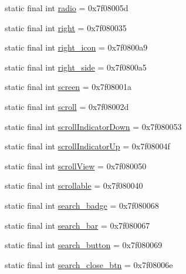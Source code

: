 \begin{CompactItemize}
\item 
static final int \hyperlink{classandroid_1_1support_1_1v7_1_1appcompat_1_1_r_1_1id_89606045473fd367db28248ace909c6f}{radio} = 0x7f08005d
\item 
static final int \hyperlink{classandroid_1_1support_1_1v7_1_1appcompat_1_1_r_1_1id_962917c5f791ff33a342365acbe1f9f0}{right} = 0x7f080035
\item 
static final int \hyperlink{classandroid_1_1support_1_1v7_1_1appcompat_1_1_r_1_1id_c4b2f4c310d9eadb3d4463b2d607e720}{right\_\-icon} = 0x7f0800a9
\item 
static final int \hyperlink{classandroid_1_1support_1_1v7_1_1appcompat_1_1_r_1_1id_aed558b6dc9fed0542465c08552c52e2}{right\_\-side} = 0x7f0800a5
\item 
static final int \hyperlink{classandroid_1_1support_1_1v7_1_1appcompat_1_1_r_1_1id_295d9d8a114c45191be984373ee8ff25}{screen} = 0x7f08001a
\item 
static final int \hyperlink{classandroid_1_1support_1_1v7_1_1appcompat_1_1_r_1_1id_e0c395762b21ee44e926575f7b79d036}{scroll} = 0x7f08002d
\item 
static final int \hyperlink{classandroid_1_1support_1_1v7_1_1appcompat_1_1_r_1_1id_8c898ecef26395ae87d51f45e345d2a4}{scrollIndicatorDown} = 0x7f080053
\item 
static final int \hyperlink{classandroid_1_1support_1_1v7_1_1appcompat_1_1_r_1_1id_fad825b3b572d052312cf45b17f80b56}{scrollIndicatorUp} = 0x7f08004f
\item 
static final int \hyperlink{classandroid_1_1support_1_1v7_1_1appcompat_1_1_r_1_1id_5381944d6f7d389cc7821c5cd06ce43b}{scrollView} = 0x7f080050
\item 
static final int \hyperlink{classandroid_1_1support_1_1v7_1_1appcompat_1_1_r_1_1id_f0120ee03747842d3ed2c225474b784d}{scrollable} = 0x7f080040
\item 
static final int \hyperlink{classandroid_1_1support_1_1v7_1_1appcompat_1_1_r_1_1id_2006e8ee7e7fc3380774fd55f1d7df15}{search\_\-badge} = 0x7f080068
\item 
static final int \hyperlink{classandroid_1_1support_1_1v7_1_1appcompat_1_1_r_1_1id_adcc9b5a8fad146ac21318fd70f0a0f7}{search\_\-bar} = 0x7f080067
\item 
static final int \hyperlink{classandroid_1_1support_1_1v7_1_1appcompat_1_1_r_1_1id_c5e3ddcdb8338d20872f87e8d5d6e4ae}{search\_\-button} = 0x7f080069
\item 
static final int \hyperlink{classandroid_1_1support_1_1v7_1_1appcompat_1_1_r_1_1id_ae0d9823033d513cb6da2e9943f4feef}{search\_\-close\_\-btn} = 0x7f08006e

\end{CompactItemize}
